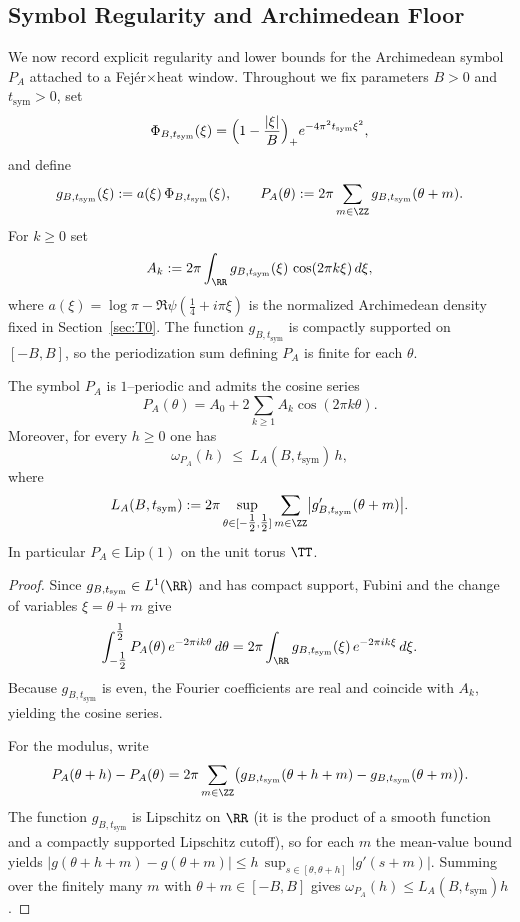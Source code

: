 
\subsection{Symbol Regularity and Archimedean Floor}\label{subsec:a3-symbol-floor}
We now record explicit regularity and lower bounds for the Archimedean symbol $P_A$ attached to a Fej\'er$\times$heat window. Throughout we fix parameters $B>0$ and $t_{\mathrm{sym}}>0$, set
\[
  \Phi_{B,t_{\mathrm{sym}}}(\xi) = \Bigl(1-\frac{|\xi|}{B}\Bigr)_{+} e^{-4\pi^2 t_{\mathrm{sym}} \xi^2},
\]
and define
\[
  g_{B,t_{\mathrm{sym}}}(\xi) := a(\xi)\,\Phi_{B,t_{\mathrm{sym}}}(\xi),\qquad
  P_A(\theta) := 2\pi\sum_{m\in\ZZ} g_{B,t_{\mathrm{sym}}}(\theta+m).
\]
For $k\ge 0$ set
\[
  A_k := 2\pi\int_{\RR} g_{B,t_{\mathrm{sym}}}(\xi)\,\cos(2\pi k\xi)\,d\xi,
\]
where $a(\xi)=\log\pi - \Re\psi(\tfrac14+i\pi\xi)$ is the normalized Archimedean density fixed in Section~\ref{sec:T0}. The function $g_{B,t_{\mathrm{sym}}}$ is compactly supported on $[-B,B]$, so the periodization sum defining $P_A$ is finite for each $\theta$.

\begin{lemma}\label{lem:a3-lipschitz-bound}
The symbol $P_A$ is $1$--periodic and admits the cosine series
\[
  P_A(\theta)=A_0+2\sum_{k\ge1}A_k\cos(2\pi k\theta).
\]
Moreover, for every $h\ge 0$ one has
\[
  \omega_{P_A}(h)\ \le\ L_A(B,t_{\mathrm{sym}})\,h,
\]
where
\[
  L_A(B,t_{\mathrm{sym}})
  := 2\pi\sup_{\theta\in[-\tfrac12,\tfrac12]}\sum_{m\in\ZZ}\bigl|g_{B,t_{\mathrm{sym}}}'(\theta+m)\bigr|.
\]
In particular $P_A\in \mathrm{Lip}(1)$ on the unit torus $\TT$.
\end{lemma}

\begin{proof}
Since $g_{B,t_{\mathrm{sym}}}\in L^1(\RR)$ and has compact support, Fubini and the change of variables $\xi=\theta+m$ give
\[
  \int_{-\tfrac12}^{\tfrac12} P_A(\theta)\,e^{-2\pi i k\theta}\,d\theta
  = 2\pi\int_{\RR} g_{B,t_{\mathrm{sym}}}(\xi)\,e^{-2\pi i k\xi}\,d\xi.
\]
Because $g_{B,t_{\mathrm{sym}}}$ is even, the Fourier coefficients are real and coincide with $A_k$, yielding the cosine series.

For the modulus, write
\[
  P_A(\theta+h)-P_A(\theta)
  = 2\pi\sum_{m\in\ZZ}\bigl(g_{B,t_{\mathrm{sym}}}(\theta+h+m)-g_{B,t_{\mathrm{sym}}}(\theta+m)\bigr).
\]
The function $g_{B,t_{\mathrm{sym}}}$ is Lipschitz on $\RR$ (it is the product of a smooth function and a compactly supported Lipschitz cutoff), so for each $m$ the mean-value bound yields
\(
|g(\theta+h+m)-g(\theta+m)| \le h\,\sup_{s\in[\theta,\theta+h]}|g'(s+m)|.
\)
Summing over the finitely many $m$ with $\theta+m\in[-B,B]$ gives
$\omega_{P_A}(h)\le L_A(B,t_{\mathrm{sym}})h$.
\end{proof}

